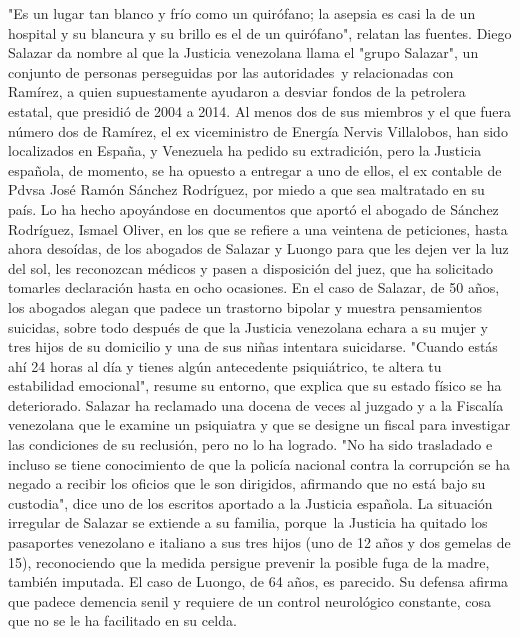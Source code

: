 \documentclass{article}%
\begin{document}
\newline%
%
"Es un lugar tan blanco y frío como un quirófano; la asepsia es casi la de un hospital y su blancura y su brillo es el de un quirófano", relatan las fuentes.%
\newline%
%
Diego Salazar da nombre al que la Justicia venezolana llama el "grupo Salazar", un conjunto de personas perseguidas por las autoridades~y relacionadas con Ramírez, a quien supuestamente ayudaron a desviar fondos de la petrolera estatal, que presidió de 2004 a 2014.%
\newline%
%
Al menos dos de sus miembros y el que fuera número dos de Ramírez, el ex viceministro de Energía Nervis Villalobos, han sido localizados en España, y Venezuela ha pedido su extradición, pero la Justicia española, de momento, se ha opuesto a entregar a uno de ellos, el ex contable de Pdvsa José Ramón Sánchez Rodríguez, por miedo a que sea maltratado en su país.%
\newline%
%
Lo ha hecho apoyándose en documentos que aportó el abogado de Sánchez Rodríguez, Ismael Oliver, en los que se refiere a una veintena de peticiones, hasta ahora desoídas, de los abogados de Salazar y Luongo para que les dejen ver la luz del sol, les reconozcan médicos y pasen a disposición del juez, que ha solicitado tomarles declaración hasta en ocho ocasiones.%
\newline%
%
En el caso de Salazar, de 50 años, los abogados alegan que padece un trastorno bipolar y muestra pensamientos suicidas, sobre todo después de que la Justicia venezolana echara a su mujer y tres hijos de su domicilio y una de sus niñas intentara suicidarse.%
\newline%
%
"Cuando estás ahí 24 horas al día y tienes algún antecedente psiquiátrico, te altera tu estabilidad emocional", resume su entorno, que explica que su estado físico se ha deteriorado.%
\newline%
%
Salazar ha reclamado una docena de veces al juzgado y a la Fiscalía venezolana que le examine un psiquiatra y que se designe un fiscal para investigar las condiciones de su reclusión, pero no lo ha logrado.%
\newline%
%
"No ha sido trasladado e incluso se tiene conocimiento de que la policía nacional contra la corrupción se ha negado a recibir los oficios que le son dirigidos, afirmando que no está bajo su custodia", dice uno de los escritos aportado a la Justicia española.%
\newline%
%
La situación irregular de Salazar se extiende a su familia, porque~la Justicia ha quitado los pasaportes venezolano e italiano a sus tres hijos (uno de 12 años y dos gemelas de 15), reconociendo que la medida persigue prevenir la posible fuga de la madre, también imputada.%
\newline%
%
El caso de Luongo, de 64 años, es parecido. Su defensa afirma que padece demencia senil y requiere de un control neurológico constante, cosa que no se le ha facilitado en su celda.%
\newline%
%
\end{document}
